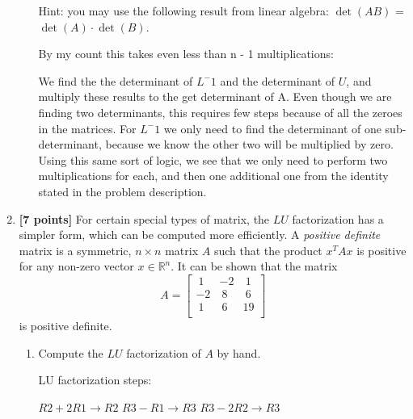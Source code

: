 \documentclass{article}
\begin{document}
\begin{enumerate}
\begin{enumerate}
Hint: you may use the following result from linear algebra: $\det(AB)$ = $\det(A) \cdot \det(B)$. \newline

\begin{mdframed}[style=MyFrame]

By my count this takes even less than n - 1 multiplications:

We find the the determinant of $L^-1$ and the determinant of $U$, and multiply these results to the get determinant of A. Even though we are finding two determinants, this requires few steps because of all the zeroes in the matrices. For $L^-1$ we only need to find the determinant of one sub-determinant, because we know the other two will be multiplied by zero. Using this same sort of logic, we see that we only need to perform two multiplications for each, and then one additional one from the identity stated in the problem description.

\end{mdframed}

\end{enumerate}

\item {\bf [7 points]} For certain special types of matrix, the $LU$ factorization has a simpler form, which can be computed more efficiently. A {\em positive definite} matrix is a symmetric, $n\times n$ matrix $A$ such that the product $x^TAx$ is positive for any non-zero vector $x \in \mathbb{R}^n$. It can be shown that the matrix
\begin{equation*}
A = \begin{bmatrix}
     ~1    &-2     &~1 \\
    -2     &~8     &~6 \\
     ~1     &~6    &19 \\
\end{bmatrix}
\end{equation*}
is positive definite.
\begin{enumerate}
\item Compute the $LU$ factorization of $A$ by hand. \newline

\begin{mdframed}[style=MyFrame]

LU factorization steps:

$R2 + 2R1 \rightarrow R2 $ \newline
$R3 - R1 \rightarrow R3 $ \newline
$R3 - 2R2 \rightarrow R3 $ \newline


\end{mdframed}
\end{enumerate}
\end{enumerate}
\end{document}
